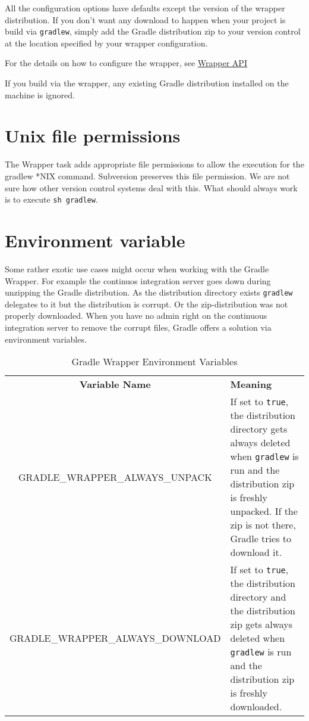 All the configuration options have defaults except the version of the wrapper distribution. If you don't want any download to happen when your project is build via \texttt{gradlew}, simply add the Gradle distribution zip to your version control at the location specified by your wrapper configuration. 

For the details on how to configure the wrapper, see \href{\API tasks/wrapper/Wrapper.html}{Wrapper API}

If you build via the wrapper, any existing Gradle distribution installed on the machine is ignored.

\section{Unix file permissions} %
\label{sec:unix_file_permissions}
The Wrapper task adds appropriate file permissions to allow the execution for the gradlew *NIX command. Subversion preserves this file permission. We are not sure how other version control systems deal with this. What should always work is to execute \texttt{sh gradlew}. 

\section{Environment variable} %
\label{sec:environment_variable}
Some rather exotic use cases might occur when working with the Gradle Wrapper. For example the continuos integration server goes down during unzipping the Gradle distribution. As the distribution directory exists \texttt{gradlew} delegates to it but the distribution is corrupt. Or the zip-distribution was not properly downloaded. When you have no admin right on the continuous integration server to remove the corrupt files, Gradle offers a solution via environment variables.

\begin{table}
\begin{center}
\begin{tabularx}{\textwidth}{cX}
	\textbf{Variable Name} & \textbf{Meaning}\\
    GRADLE\_WRAPPER\_ALWAYS\_UNPACK & If set to \texttt{true}, the distribution directory gets always deleted when \texttt{gradlew} is run and the distribution zip is freshly unpacked. If the zip is not there, Gradle tries to download it. \\
	GRADLE\_WRAPPER\_ALWAYS\_DOWNLOAD & If set to \texttt{true}, the distribution directory and the distribution zip gets always deleted when \texttt{gradlew} is run and the distribution zip is freshly downloaded. \\
\end{tabularx}
\end{center}
\caption{Gradle Wrapper Environment Variables}
\end{table}

